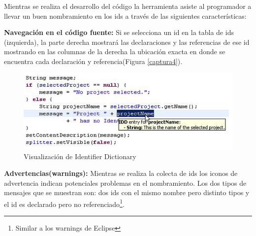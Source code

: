 \documentclass[a4paper,12pt]{report}
\begin{document}
Mientras se realiza el desarrollo del código la herramienta asiste al programador a llevar un buen nombramiento en los ids a través de las siguientes características:

\textbf{Navegación en el código fuente:} Si se selecciona un id en la tabla de ids (izquierda), la parte derecha mostrará las declaraciones y las referencias de ese id mostrando en las columnas de la derecha la ubicación exacta en donde se encuentra cada declaración y referencia(Figura \ref{captura4}).


%

\begin{figure}[t] %
\centering
\includegraphics[scale= 0.80]{./idd_7.png}
\caption{Visualización de Identifier Dictionary}
\label{captura8}
\end{figure}

\textbf{Advertencias(warnings):} Mientras se realiza la colecta de ids los iconos de advertencia indican potenciales problemas en el nombramiento.  Los dos tipos de mensajes que se muestran son: dos ids con el mismo nombre pero distinto tipos y el id es declarado pero no referenciado\footnote[1]{Similar a los warnings de Eclipse}.


\end{document}
